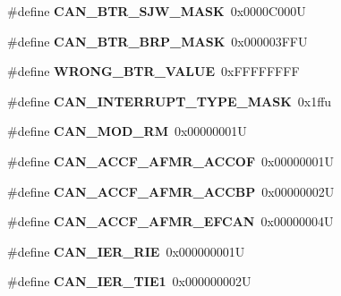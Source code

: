 \begin{DoxyCompactItemize}
\item 
\mbox{\label{can-defs_8h_a84c6da99153dce599c42381571e4168d}} 
\#define {\bfseries C\+A\+N\+\_\+\+B\+T\+R\+\_\+\+S\+J\+W\+\_\+\+M\+A\+SK}~0x0000\+C000U
\item 
\mbox{\label{can-defs_8h_a8ac64560d74eadea142ccd661ed3d772}} 
\#define {\bfseries C\+A\+N\+\_\+\+B\+T\+R\+\_\+\+B\+R\+P\+\_\+\+M\+A\+SK}~0x000003\+F\+FU
\item 
\mbox{\label{can-defs_8h_a612f0e90f793105ae1d2acc9dade7ec0}} 
\#define {\bfseries W\+R\+O\+N\+G\+\_\+\+B\+T\+R\+\_\+\+V\+A\+L\+UE}~0x\+F\+F\+F\+F\+F\+F\+FF
\item 
\mbox{\label{can-defs_8h_ac5dfa9c6a482dd8065932798ff7f89c2}} 
\#define {\bfseries C\+A\+N\+\_\+\+I\+N\+T\+E\+R\+R\+U\+P\+T\+\_\+\+T\+Y\+P\+E\+\_\+\+M\+A\+SK}~0x1ffu
\item 
\mbox{\label{can-defs_8h_afd10049f6c1d6a63bfb481578d97de16}} 
\#define {\bfseries C\+A\+N\+\_\+\+M\+O\+D\+\_\+\+RM}~0x00000001U
\item 
\mbox{\label{can-defs_8h_a75b87a9df7176ecac5a64631fcddda1a}} 
\#define {\bfseries C\+A\+N\+\_\+\+A\+C\+C\+F\+\_\+\+A\+F\+M\+R\+\_\+\+A\+C\+C\+OF}~0x00000001U
\item 
\mbox{\label{can-defs_8h_a436491cb73dd5dd58052dcc30c10e7bd}} 
\#define {\bfseries C\+A\+N\+\_\+\+A\+C\+C\+F\+\_\+\+A\+F\+M\+R\+\_\+\+A\+C\+C\+BP}~0x00000002U
\item 
\mbox{\label{can-defs_8h_a6f37e8d13c617514b1108ae76bac5e22}} 
\#define {\bfseries C\+A\+N\+\_\+\+A\+C\+C\+F\+\_\+\+A\+F\+M\+R\+\_\+\+E\+F\+C\+AN}~0x00000004U
\item 
\mbox{\label{can-defs_8h_a25db0b070c10a960394a51c1374c5850}} 
\#define {\bfseries C\+A\+N\+\_\+\+I\+E\+R\+\_\+\+R\+IE}~0x000000001U
\item 
\mbox{\label{can-defs_8h_a8acb357ce8234e896c4f4cd550beb2c8}} 
\#define {\bfseries C\+A\+N\+\_\+\+I\+E\+R\+\_\+\+T\+I\+E1}~0x000000002U
\item 

\end{DoxyCompactItemize}
